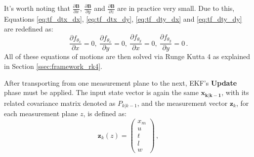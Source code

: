 \newpage

It's worth noting that $\frac{\partial \textbf{B}}{\partial x}$, $\frac{\partial \textbf{B}}{\partial y}$ and $\frac{\partial \textbf{B}}{\partial z}$ are in practice very small.
Due to this, Equations \eqref{eq:tf_dtx_dx}, \eqref{eq:tf_dtx_dy}, \eqref{eq:tf_dty_dx} and \eqref{eq:tf_dty_dy} are redefined as:
    \begin{equation*}
        \frac{\partial f_{\theta_x}}{\partial x} = 0, ~
        \frac{\partial f_{\theta_x}}{\partial y} = 0, ~
        \frac{\partial f_{\theta_y}}{\partial x} = 0, ~
        \frac{\partial f_{\theta_y}}{\partial y} = 0\,.
    \end{equation*}
All of these equations of motions are then solved via Runge Kutta 4 as explained in Section \ref{ssec:framework_rk4}.

After transporting from one measurement plane to the next, EKF's \textbf{Update} phase must be applied.
The input state vector is again the same $\mathbf{x_{k|k-1}}$, with its related covariance matrix denoted as $P_{k|k-1}$, and the measurement vector $\mathbf{z}_k$, for each measurement plane $z$, is defined as:
    \begin{equation*}
        \mathbf{z}_k(z) = \begin{pmatrix}x_m\\ u\\ t\\ l\\ w\end{pmatrix}\,,
    \end{equation*}

